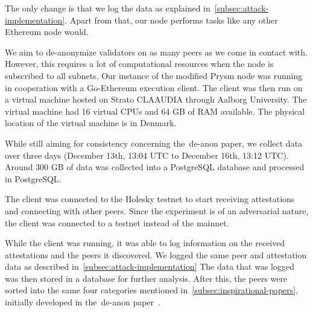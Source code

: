 The only change is that we log the data as explained in~\autoref{subsec:attack-implementation}.
Apart from that, our node performs tasks like any other Ethereum node would.


We aim to de-anonymize validators on as many peers as we come in contact with.
However, this requires a lot of computational resources when the node is subscribed to all subnets.
Our instance of the modified Prysm node was running in cooperation with a Go-Ethereum execution client.
The client was then run on a virtual machine hosted on Strato CLAAUDIA through Aalborg University.
The virtual machine had 16 virtual CPUs and 64 GB of RAM available.
The physical location of the virtual machine is in Denmark.

While still aiming for consistency concerning the~\gls{de-anon paper}, we collect data over three days (December 13th, 13:04 UTC to December 16th, 13:12 UTC).
Around 300 GB of data was collected into a PostgreSQL database and processed in PostgreSQL\@.


The client was connected to the Holesky testnet to start receiving attestations and connecting with other peers.
Since the experiment is of an adversarial nature, the client was connected to a testnet instead of the mainnet.

While the client was running, it was able to log information on the received attestations and the peers it discovered.
We logged the same peer and attestation data as described in~\autoref{subsec:attack-implementation}
The data that was logged was then stored in a database for further analysis.
After this, the peers were sorted into the same four categories mentioned in~\autoref{subsec:inspirational-papers}, initially developed in the~\gls{de-anon paper}~\cite{heimbach2024deanonymizingethereumvalidatorsp2p}.